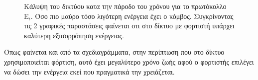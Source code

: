 \begin{figure}[H]
  \centering
  \caption{Κάλυψη του δικτύου κατα την πάροδο του χρόνου για το πρωτόκολλο $\text{E}_{i}$. Όσο πιο μαύρο τόσο λιγότερη ενέργεια έχει ο κόμβος. Συγκρίνοντας τις 2
γραφικές παραστάσεις φαίνεται οτι στο δίκτυο με φορτιστή υπάρχει καλύτερη εξισορρόπηση ενέργειας.}
  \label{fig:1exp_4_3}
\end{figure}

Όπως φαίνεται και από τα σχεδιαγράμματα, στην περίπτωση που στο δίκτυο χρησιμοποιείται φόρτιση, αυτό έχει μεγαλύτερο χρόνο ζωής αφού ο φορτιστής επιλέγει να δώσει
την ενέργεια εκεί που πραγματικά την χρειάζεται.







